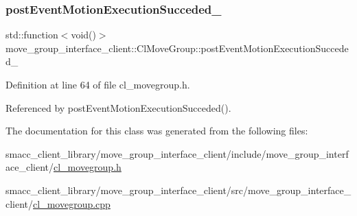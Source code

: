 \subsubsection{\texorpdfstring{post\+Event\+Motion\+Execution\+Succeded\+\_\+}{postEventMotionExecutionSucceded\_}}
{\footnotesize\ttfamily std\+::function$<$void()$>$ move\+\_\+group\+\_\+interface\+\_\+client\+::\+Cl\+Move\+Group\+::post\+Event\+Motion\+Execution\+Succeded\+\_\+\hspace{0.3cm}{\ttfamily [private]}}



Definition at line 64 of file cl\+\_\+movegroup.\+h.



Referenced by post\+Event\+Motion\+Execution\+Succeded().



The documentation for this class was generated from the following files\+:\begin{DoxyCompactItemize}
\item 
smacc\+\_\+client\+\_\+library/move\+\_\+group\+\_\+interface\+\_\+client/include/move\+\_\+group\+\_\+interface\+\_\+client/\hyperlink{cl__movegroup_8h}{cl\+\_\+movegroup.\+h}\item 
smacc\+\_\+client\+\_\+library/move\+\_\+group\+\_\+interface\+\_\+client/src/move\+\_\+group\+\_\+interface\+\_\+client/\hyperlink{cl__movegroup_8cpp}{cl\+\_\+movegroup.\+cpp}\end{DoxyCompactItemize}
